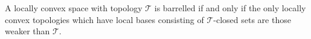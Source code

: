A locally convex space with topology $\mathcal{T}$ is barrelled if and only if the only locally convex topologies which have local bases consisting of $\mathcal{T}$-closed sets are those weaker than $\mathcal{T}$.
